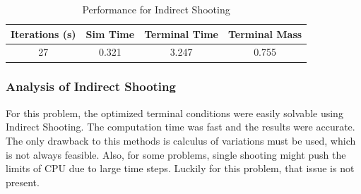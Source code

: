 \documentclass[]{article}
\begin{document}
\begin{table}
	\centering
	\begin{tabular}{||c c c c||} 
		\hline
		Iterations (s) & Sim Time & Terminal Time & Terminal Mass\\ [0.5ex] 
		\hline\hline
		27            & 0.321     &   3.247       & 0.755\\ [1ex]
		\hline
	\end{tabular}
\caption{Performance for Indirect Shooting}
\label{table:1}
\end{table}

\subsubsection{Analysis of Indirect Shooting}
For this problem, the optimized terminal conditions were easily solvable using Indirect Shooting. The computation time was fast and the results were accurate. The only drawback to this methods is calculus of variations must be used, which is not always feasible. Also, for some problems, single shooting might push the limits of CPU due to large time steps. Luckily for this problem, that issue is not present.
\FloatBarrier
\end{document}

